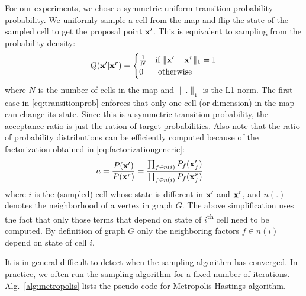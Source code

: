 \documentclass[letterpaper, 10 pt, conference]{ieeeconf} %
\begin{document}
For our experiments, we chose a symmetric uniform transition probability
probability.  We uniformly sample a cell from the map and flip the state of the
sampled cell to get the proposal point $\mathbf{x}'$. This is equivalent to sampling
from the probability density:
\begin{align}
  Q(\mathbf{x}'| \mathbf{x}^r) = \begin{cases}
    \frac{1}{N} & \text{if $\|\mathbf{x}' - \mathbf{x}^r\|_1 = 1$}\\
      0 & \text{ otherwise}
  \end{cases}
  \label{eq:transitionprob}
\end{align}
where $N$ is the number of cells in the map and $\|.\|_1$ is the L1-norm. The
first case in \eqref{eq:transitionprob} enforces that only one cell (or dimension)
in the map can change its state. Since this is a symmetric transition
probability, the acceptance ratio is just the ration of target probabilities.
Also note that the ratio of probability distributions can be efficiently
computed because of the factorization obtained in
\eqref{eq:factorizationgeneric}:
\begin{align}
  a &= \frac{P(\mathbf{x}')}{P(\mathbf{x}^r)}
    = \frac{\prod_{f \in n(i)} P_f(\mathbf{x}'_f)}{\prod_{f \in n(i)} P_f(\mathbf{x}^r_f)}
  \label{eq:acceptanceprob}
\end{align}
where $i$ is the (sampled) cell whose state is different in $\mathbf{x}'$ and $\mathbf{x}^r$,
and $n(.)$ denotes the neighborhood of a vertex in graph $G$.  
The above simplification uses the fact that only those terms  that depend on
state of $i$\textsuperscript{th} cell need to be computed. By definition
of graph $G$ only the neighboring factors $f \in n(i)$ depend on state of cell $i$.

It is in general difficult to detect when the sampling algorithm has converged.
In practice, we often run the sampling algorithm for a fixed number of
iterations. Alg.~\ref{alg:metropolis} lists the pseudo code for Metropolis
Hastings algorithm.

\end{document}

